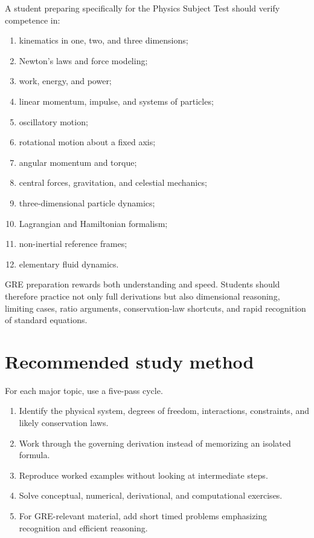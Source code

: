 A student preparing specifically for the Physics Subject Test should verify competence in:
\begin{enumerate}
\item kinematics in one, two, and three dimensions;
\item Newton's laws and force modeling;
\item work, energy, and power;
\item linear momentum, impulse, and systems of particles;
\item oscillatory motion;
\item rotational motion about a fixed axis;
\item angular momentum and torque;
\item central forces, gravitation, and celestial mechanics;
\item three-dimensional particle dynamics;
\item Lagrangian and Hamiltonian formalism;
\item non-inertial reference frames;
\item elementary fluid dynamics.
\end{enumerate}

GRE preparation rewards both understanding and speed.  Students should therefore practice not only
full derivations but also dimensional reasoning, limiting cases, ratio arguments, conservation-law
shortcuts, and rapid recognition of standard equations.

\section{Recommended study method}

For each major topic, use a five-pass cycle.
\begin{enumerate}
\item Identify the physical system, degrees of freedom, interactions, constraints, and likely conservation laws.
\item Work through the governing derivation instead of memorizing an isolated formula.
\item Reproduce worked examples without looking at intermediate steps.
\item Solve conceptual, numerical, derivational, and computational exercises.
\item For GRE-relevant material, add short timed problems emphasizing recognition and efficient reasoning.
\end{enumerate}

